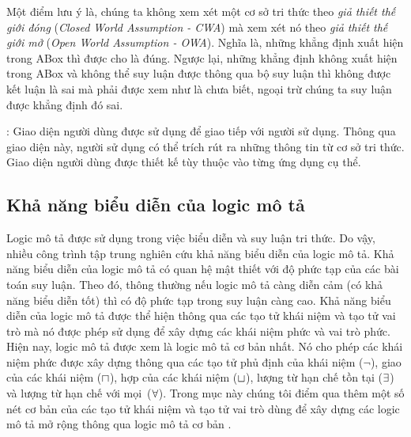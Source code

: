 Một điểm lưu ý là, chúng ta không xem xét một cơ sở tri thức theo {\em giả thiết thế giới đóng} ({\em Closed World Assumption - CWA}) mà xem xét nó theo {\em giả thiết thế giới mở} ({\em Open World Assumption - OWA}). Nghĩa là, những khẳng định xuất hiện trong ABox thì được cho là đúng. Ngược lại, những khẳng định không xuất hiện trong ABox và không thể suy luận được thông qua bộ suy luận thì không được kết luận là sai mà phải được xem như là chưa biết, ngoại trừ chúng ta suy luận được khẳng định đó sai.
	
: Giao diện người dùng được sử dụng để giao tiếp với người sử dụng. Thông qua giao diện này, người sử dụng có thể trích rút ra những thông tin từ cơ sở tri thức. Giao diện người dùng được thiết kế tùy thuộc vào từng ứng dụng cụ thể.  

\subsection{Khả năng biểu diễn của logic mô tả}
\label{sec:Chap1.Expressiveness}
Logic mô tả được sử dụng trong việc biểu diễn và suy luận tri thức. Do vậy, nhiều công trình tập trung nghiên cứu khả năng biểu diễn của logic mô tả. Khả năng biểu diễn của logic mô tả có quan hệ mật thiết với độ phức tạp của các bài toán suy luận. Theo đó, thông thường nếu logic mô tả càng diễn cảm (có khả năng biểu diễn tốt) thì có độ phức tạp trong suy luận càng cao. Khả năng biểu diễn của logic mô tả được thể hiện thông qua các tạo tử khái niệm và tạo tử vai trò mà nó được phép sử dụng để xây dựng các khái niệm phức và vai trò phức. 
Hiện nay, logic mô tả \ALC được xem là logic mô tả cơ bản nhất. Nó cho phép các khái niệm phức được xây dựng thông qua các tạo tử phủ định của khái niệm ($\neg$), giao của các khái niệm ($\sqcap$), hợp của các khái niệm ($\sqcup$), lượng từ hạn chế tồn tại ($\exists$) và lượng từ hạn chế với mọi~($\forall$).
Trong mục này chúng tôi điểm qua thêm một số nét cơ bản của các tạo tử khái niệm và tạo tử vai trò dùng để xây dựng các logic mô tả mở rộng thông qua logic mô tả cơ bản \ALC.

